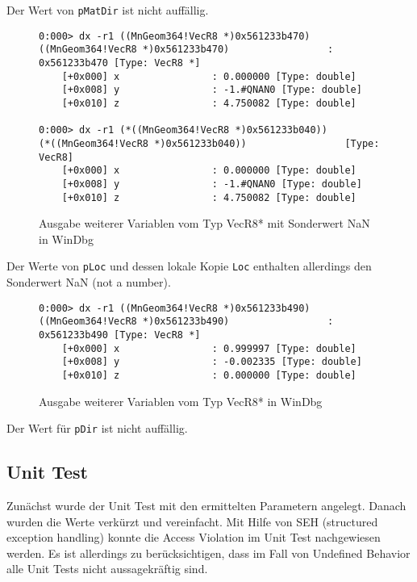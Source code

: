 Der Wert von \verb|pMatDir| ist nicht auffällig.

\begin{figure}[H]
\begin{lstlisting}
0:000> dx -r1 ((MnGeom364!VecR8 *)0x561233b470)
((MnGeom364!VecR8 *)0x561233b470)                 : 0x561233b470 [Type: VecR8 *]
    [+0x000] x                : 0.000000 [Type: double]
    [+0x008] y                : -1.#QNAN0 [Type: double]
    [+0x010] z                : 4.750082 [Type: double]

0:000> dx -r1 (*((MnGeom364!VecR8 *)0x561233b040))
(*((MnGeom364!VecR8 *)0x561233b040))                 [Type: VecR8]
    [+0x000] x                : 0.000000 [Type: double]
    [+0x008] y                : -1.#QNAN0 [Type: double]
    [+0x010] z                : 4.750082 [Type: double]
\end{lstlisting}
\caption{Ausgabe weiterer Variablen vom Typ VecR8* mit Sonderwert NaN in WinDbg}
\end{figure}

Der Werte von \verb|pLoc| und dessen lokale Kopie \verb|Loc| enthalten allerdings den Sonderwert NaN (not a number).

\begin{figure}[H]
\begin{lstlisting}
0:000> dx -r1 ((MnGeom364!VecR8 *)0x561233b490)
((MnGeom364!VecR8 *)0x561233b490)                 : 0x561233b490 [Type: VecR8 *]
    [+0x000] x                : 0.999997 [Type: double]
    [+0x008] y                : -0.002335 [Type: double]
    [+0x010] z                : 0.000000 [Type: double]
\end{lstlisting}
\caption{Ausgabe weiterer Variablen vom Typ VecR8* in WinDbg}
\end{figure}


Der Wert für \verb|pDir| ist nicht auffällig.

\subsection{Unit Test}

Zunächst wurde der Unit Test mit den ermittelten Parametern angelegt. Danach wurden die Werte verkürzt und vereinfacht.
Mit Hilfe von SEH (structured exception handling) konnte die Access Violation im Unit Test nachgewiesen werden.
Es ist allerdings zu berücksichtigen, dass im Fall von Undefined Behavior alle Unit Tests nicht aussagekräftig sind.

